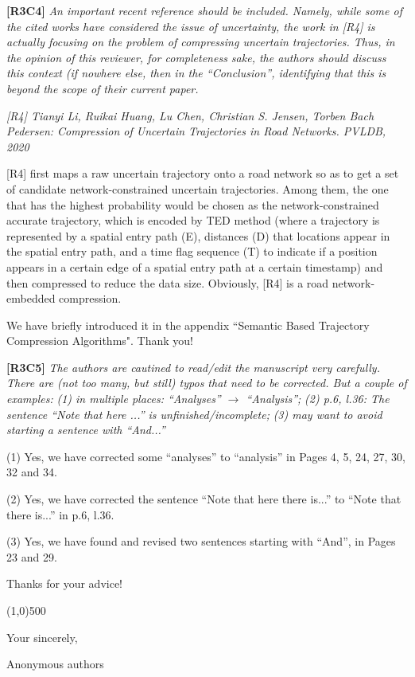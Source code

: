 \documentclass{letter}
\begin{document}
\textbf{[R3C4]} \emph{An important recent reference should be included. Namely, while some of the cited works have considered the issue of uncertainty, the work in [R4] is actually focusing on the problem of compressing uncertain trajectories. Thus, in the opinion of this reviewer, for completeness sake, the authors should discuss this context (if nowhere else, then in the ``Conclusion'', identifying that this is beyond the scope of their current paper. }

\emph{[R4] Tianyi Li, Ruikai Huang, Lu Chen, Christian S. Jensen, Torben Bach Pedersen:
	Compression of Uncertain Trajectories in Road Networks. PVLDB, 2020}

[R4] first maps a raw uncertain trajectory onto a road network so as to get a set of candidate network-constrained uncertain trajectories. Among them, the one that has the highest probability would be chosen
as the network-constrained accurate trajectory, which is encoded by TED method (where a trajectory is represented by a spatial entry path (E),
distances (D) that locations appear in the spatial entry path, and a
time flag sequence (T) to indicate if a position appears in a certain
edge of a spatial entry path at a certain timestamp) and then compressed to reduce the data size. Obviously, [R4] is a road network-embedded compression. 


We have briefly introduced it in the appendix ``Semantic Based Trajectory Compression Algorithms". Thank you!


\textbf{[R3C5]} \emph{The authors are cautined to read/edit the manuscript very carefully. There are (not too many, but still) typos that need to be corrected. But a couple of examples:}
  \emph{(1) in multiple places: ``Analyses'' $\rightarrow$ ``Analysis'';}
  \emph{(2) p.6, l.36: The sentence ``Note that here ...'' is unfinished/incomplete;}
  \emph{(3) may want to avoid starting a sentence with ``And...''}


(1) Yes, we have corrected some ``analyses'' to ``analysis'' in Pages 4, 5, 24, 27, 30, 32 and 34.

(2) Yes, we have corrected the sentence ``Note that here there is...'' to ``Note that there is...'' in p.6, l.36.

(3) Yes, we have found and revised two sentences starting with ``And'', in Pages 23 and 29.

Thanks for your advice!

\line(1,0){500}



Your sincerely,

Anonymous authors

%
%
\end{document}
